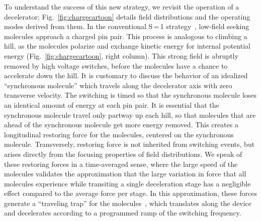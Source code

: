 \documentclass[%
 reprint,
 amsmath,amssymb,
 aps,
prl,
]{revtex4-1}
\begin{document}
To understand the success of this new strategy, we revisit the operation of a decelerator; Fig.~\ref{fig:chargecartoon} details field distributions and the operating modes derived from them.
In the conventional S\,=\,1 strategy~\cite{VanDeMeerakker2012}, low-field seeking molecules approach a charged pin pair. 
This process is analogous to climbing a hill, as the molecules polarize and exchange kinetic energy for internal potential energy (Fig.~\ref{fig:chargecartoon}, right column).
This strong field is abruptly removed by high voltage switches, before the molecules have a chance to accelerate down the hill.
It is customary to discuss the behavior of an idealized ``synchronous molecule'' which travels along the decelerator axis with zero transverse velocity.
The switching is timed so that the synchronous molecule loses an identical amount of energy at each pin pair.
It is essential that the synchronous molecule travel only partway up each hill, so that molecules that are ahead of the synchronous molecule get more energy removed.
This creates a longitudinal restoring force for the molecules, centered on the synchronous molecule.
Transversely, restoring force is not inherited from switching events, but arises directly from the focusing properties of field distributions.
We speak of these restoring forces in a time-averaged sense, where the large speed of the molecules validates the approximation that the large variation in force that all molecules experience while transiting a single deceleration stage has a negligible effect compared to the average force per stage.
In this approximation, these forces generate a ``traveling trap'' for the molecules~\cite{Bethlem2000}, which translates along the device and decelerates according to a programmed ramp of the switching frequency.
\end{document}
